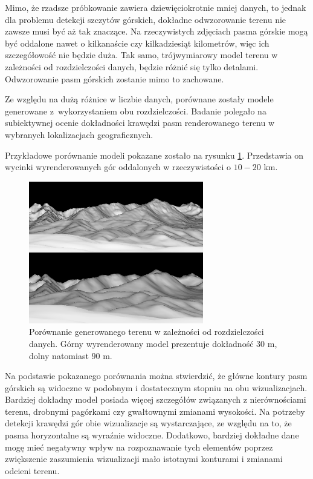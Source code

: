 Mimo, że rzadsze próbkowanie zawiera dziewięciokrotnie mniej danych, to jednak dla problemu detekcji szczytów górskich, dokładne odwzorowanie terenu nie zawsze musi być aż tak znaczące. Na rzeczywistych zdjęciach pasma górskie mogą być oddalone nawet o kilkanaście czy kilkadziesiąt kilometrów, więc ich szczegółowość nie będzie duża. Tak samo, trójwymiarowy model terenu w zależności od rozdzielczości danych, będzie różnić się tylko detalami. Odwzorowanie pasm górskich zostanie mimo to zachowane. 



Ze względu na dużą różnice w liczbie danych, porównane zostały modele generowane z~wykorzystaniem obu rozdzielczości. Badanie polegało na subiektywnej ocenie dokładności krawędzi pasm renderowanego terenu w wybranych lokalizacjach geograficznych.

Przykładowe porównanie modeli pokazane zostało na rysunku \ref{fig:render-resolution-comp}. Przedstawia on wycinki wyrenderowanych gór oddalonych w rzeczywistości o $10-20$ km. 

\begin{figure}[!h]
    \centering \includegraphics[width=0.65\linewidth]{img/new_compare.png}
    \caption{Porównanie generowanego terenu w zależności od rozdzielczości danych. Górny wyrenderowany model prezentuje dokładność $30$ m, dolny natomiast $90$ m.}
    \label{fig:render-resolution-comp}
\end{figure}

Na podstawie pokazanego porównania można stwierdzić, że główne kontury pasm górskich są widoczne w podobnym i dostatecznym stopniu na obu wizualizacjach. Bardziej dokładny model posiada więcej szczegółów związanych z nierównościami terenu, drobnymi pagórkami czy gwałtownymi zmianami wysokości. Na potrzeby detekcji krawędzi gór obie wizualizacje są wystarczające, ze względu na to, że pasma horyzontalne są wyraźnie widoczne. Dodatkowo, bardziej dokładne dane mogę mieć negatywny wpływ na rozpoznawanie tych elementów poprzez zwiększenie zaszumienia wizualizacji mało istotnymi konturami i zmianami odcieni terenu. 

